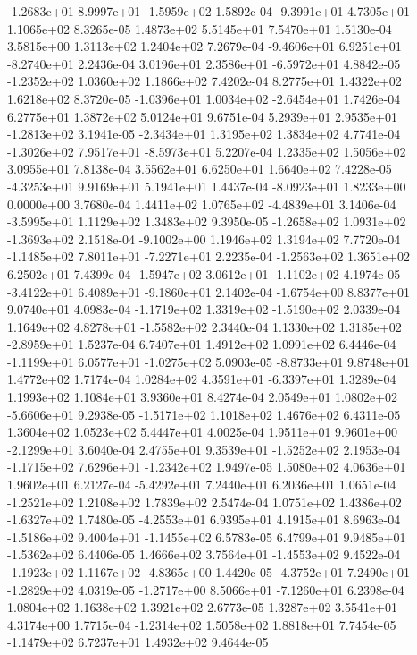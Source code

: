 -1.2683e+01  8.9997e+01 -1.5959e+02  1.5892e-04
-9.3991e+01  4.7305e+01  1.1065e+02  8.3265e-05
1.4873e+02 5.5145e+01 7.5470e+01  1.5130e-04
3.5815e+00 1.3113e+02 1.2404e+02  7.2679e-04
-9.4606e+01  6.9251e+01 -8.2740e+01  2.2436e-04
 3.0196e+01  2.3586e+01 -6.5972e+01  4.8842e-05
-1.2352e+02  1.0360e+02  1.1866e+02  7.4202e-04
8.2775e+01 1.4322e+02 1.6218e+02  8.3720e-05
-1.0396e+01  1.0034e+02 -2.6454e+01  1.7426e-04
6.2775e+01 1.3872e+02 5.0124e+01  9.6751e-04
 5.2939e+01  2.9535e+01 -1.2813e+02  3.1941e-05
-2.3434e+01  1.3195e+02  1.3834e+02  4.7741e-04
-1.3026e+02  7.9517e+01 -8.5973e+01  5.2207e-04
1.2335e+02 1.5056e+02 3.0955e+01  7.8138e-04
3.5562e+01 6.6250e+01 1.6640e+02  7.4228e-05
-4.3253e+01  9.9169e+01  5.1941e+01  1.4437e-04
-8.0923e+01  1.8233e+00  0.0000e+00  3.7680e-04
 1.4411e+02  1.0765e+02 -4.4839e+01  3.1406e-04
-3.5995e+01  1.1129e+02  1.3483e+02  9.3950e-05
-1.2658e+02  1.0931e+02 -1.3693e+02  2.1518e-04
-9.1002e+00  1.1946e+02  1.3194e+02  7.7720e-04
-1.1485e+02  7.8011e+01 -7.2271e+01  2.2235e-04
-1.2563e+02  1.3651e+02  6.2502e+01  7.4399e-04
-1.5947e+02  3.0612e+01 -1.1102e+02  4.1974e-05
-3.4122e+01  6.4089e+01 -9.1860e+01  2.1402e-04
-1.6754e+00  8.8377e+01  9.0740e+01  4.0983e-04
-1.1719e+02  1.3319e+02 -1.5190e+02  2.0339e-04
 1.1649e+02  4.8278e+01 -1.5582e+02  2.3440e-04
 1.1330e+02  1.3185e+02 -2.8959e+01  1.5237e-04
6.7407e+01 1.4912e+02 1.0991e+02  6.4446e-04
-1.1199e+01  6.0577e+01 -1.0275e+02  5.0903e-05
-8.8733e+01  9.8748e+01  1.4772e+02  1.7174e-04
 1.0284e+02  4.3591e+01 -6.3397e+01  1.3289e-04
1.1993e+02 1.1084e+01 3.9360e+01  8.4274e-04
 2.0549e+01  1.0802e+02 -5.6606e+01  9.2938e-05
-1.5171e+02  1.1018e+02  1.4676e+02  6.4311e-05
1.3604e+02 1.0523e+02 5.4447e+01  4.0025e-04
 1.9511e+01  9.9601e+00 -2.1299e+01  3.6040e-04
 2.4755e+01  9.3539e+01 -1.5252e+02  2.1953e-04
-1.1715e+02  7.6296e+01 -1.2342e+02  1.9497e-05
1.5080e+02 4.0636e+01 1.9602e+01  6.2127e-04
-5.4292e+01  7.2440e+01  6.2036e+01  1.0651e-04
-1.2521e+02  1.2108e+02  1.7839e+02  2.5474e-04
 1.0751e+02  1.4386e+02 -1.6327e+02  1.7480e-05
-4.2553e+01  6.9395e+01  4.1915e+01  8.6963e-04
-1.5186e+02  9.4004e+01 -1.1455e+02  6.5783e-05
 6.4799e+01  9.9485e+01 -1.5362e+02  6.4406e-05
 1.4666e+02  3.7564e+01 -1.4553e+02  9.4522e-04
-1.1923e+02  1.1167e+02 -4.8365e+00  1.4420e-05
-4.3752e+01  7.2490e+01 -1.2829e+02  4.0319e-05
-1.2717e+00  8.5066e+01 -7.1260e+01  6.2398e-04
1.0804e+02 1.1638e+02 1.3921e+02  2.6773e-05
1.3287e+02 3.5541e+01 4.3174e+00  1.7715e-04
-1.2314e+02  1.5058e+02  1.8818e+01  7.7454e-05
-1.1479e+02  6.7237e+01  1.4932e+02  9.4644e-05
